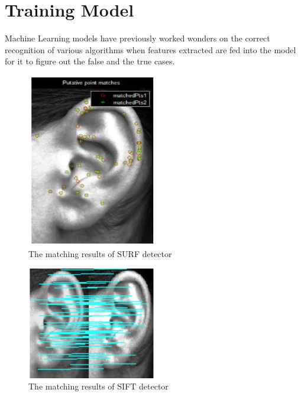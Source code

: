 \section{Training Model} \label{sec:build3} Machine Learning models have previously worked wonders on the correct recognition of various algorithms when features extracted are fed into the model for it to figure out the false and the true cases. 

\begin{figure}[t]
	\begin{center}
		\includegraphics[width=0.5\textwidth]{Figures/Figure15}
	\end{center}
	\caption{The matching results of SURF detector}
	\label{fig:Figure15}
\end{figure}

\begin{figure}[t]
	\begin{center}
		\includegraphics[width=0.5\textwidth]{Figures/Figure16}
	\end{center}
	\caption{The matching results of SIFT detector}
	\label{fig:Figure16}
\end{figure}


